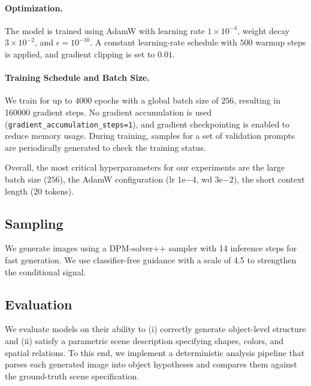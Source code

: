 \documentclass[10pt,twocolumn,letterpaper]{article}
\begin{document}
\paragraph{Optimization.}
The model is trained using AdamW with learning rate $1\times 10^{-4}$, weight decay $3\times 10^{-2}$, and $\epsilon=10^{-10}$. A constant learning-rate schedule with $500$ warmup steps is applied, and gradient clipping is set to $0.01$. %

\paragraph{Training Schedule and Batch Size.}
We train for up to $4000$ epochs with a global batch size of $256$, resulting in 160000 gradient steps. 
No gradient accumulation is used (\texttt{gradient\_accumulation\_steps=1}), and gradient checkpointing is enabled to reduce memory usage. %
During training, samples for a set of validation prompts are periodically generated to check the training status. %

Overall, the most critical hyperparameters for our experiments are the large batch size ($256$), the AdamW configuration (lr $1\mathrm{e}{-4}$, wd $3\mathrm{e}{-2}$), the short context length ($20$ tokens).%

\subsection{Sampling}\label{method:sampling}
We generate images using a DPM-solver++\cite{lu2022dpm++} sampler with 14 inference steps for fast generation. We use classifier-free guidance \cite{ho2022classifierFreeGuidance} with a scale of 4.5 to strengthen the conditional signal. 

\subsection{Evaluation}\label{method:evaluation}
We evaluate models on their ability to (i) correctly generate object-level structure and (ii) satisfy a parametric scene description specifying shapes, colors, and spatial relations. To this end, we implement a deterministic analysis pipeline that parses each generated image into object hypotheses and compares them against the ground-truth scene specification.
\end{document}
